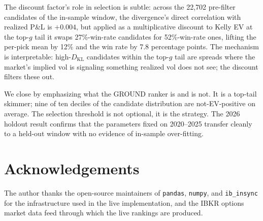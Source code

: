 \documentclass[11pt]{article}
\newcommand{\KL}{D_{\mathrm{KL}}}
\theoremstyle{definition}
\theoremstyle{remark}
\begin{document}
The discount factor's role in selection is subtle: across the
22{,}702 pre-filter candidates of the in-sample window, the
divergence's direct correlation with realized P\&L is $+0.004$, but
applied as a multiplicative discount to Kelly EV at the top-$g$ tail
it swaps 27\%-win-rate candidates for 52\%-win-rate ones, lifting
the per-pick mean by 12\% and the win rate by 7.8 percentage points.
The mechanism is interpretable: high-$\KL$ candidates within the
top-$g$ tail are spreads where the market's implied vol is
signaling something realized vol does not see; the discount filters
these out.

We close by emphasizing what the GROUND ranker is and is not. It is
a top-tail skimmer; nine of ten deciles of the candidate distribution
are not-EV-positive on average. The selection threshold is not
optional, it is the strategy. The 2026 holdout result confirms that
the parameters fixed on 2020--2025 transfer cleanly to a held-out
window with no evidence of in-sample over-fitting.


\section*{Acknowledgements}

The author thanks the open-source maintainers of \texttt{pandas},
\texttt{numpy}, and \texttt{ib\_insync} for the infrastructure used in
the live implementation, and the IBKR options market data feed
through which the live rankings are produced.
\end{document}
